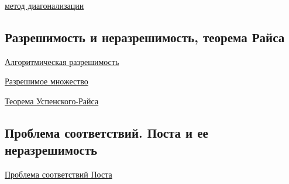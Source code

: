 \documentclass{article}
\begin{document}
\href{https://mipt.lectoriy.ru/file/synopsis/pdf/Maths-CompComplexity-M04-Musatov-140924.04.pdf}{метод диагонализации}

\subsection{Разрешимость и неразрешимость, теорема Райса}

\href{https://ru.wikipedia.org/wiki/%D0%90%D0%BB%D0%B3%D0%BE%D1%80%D0%B8%D1%82%D0%BC%D0%B8%D1%87%D0%B5%D1%81%D0%BA%D0%B0%D1%8F_%D1%80%D0%B0%D0%B7%D1%80%D0%B5%D1%88%D0%B8%D0%BC%D0%BE%D1%81%D1%82%D1%8C}{Алгоритмическая разрешимость}

\href{https://ru.wikipedia.org/wiki/%D0%A0%D0%B0%D0%B7%D1%80%D0%B5%D1%88%D0%B8%D0%BC%D0%BE%D0%B5_%D0%BC%D0%BD%D0%BE%D0%B6%D0%B5%D1%81%D1%82%D0%B2%D0%BE}{Разрешимое множество}

\href{https://neerc.ifmo.ru/wiki/index.php?title=%D0%A1%D0%B2%D0%BE%D0%B9%D1%81%D1%82%D0%B2%D0%B0_%D0%BF%D0%B5%D1%80%D0%B5%D1%87%D0%B8%D1%81%D0%BB%D0%B8%D0%BC%D1%8B%D1%85_%D1%8F%D0%B7%D1%8B%D0%BA%D0%BE%D0%B2._%D0%A2%D0%B5%D0%BE%D1%80%D0%B5%D0%BC%D0%B0_%D0%A3%D1%81%D0%BF%D0%B5%D0%BD%D1%81%D0%BA%D0%BE%D0%B3%D0%BE-%D0%A0%D0%B0%D0%B9%D1%81%D0%B0}{Теорема Успенского-Райса}

\subsection{Проблема соответствий. Поста и ее неразрешимость}

\href{https://neerc.ifmo.ru/wiki/index.php?title=%D0%9F%D1%80%D0%B8%D0%BC%D0%B5%D1%80%D1%8B_%D0%BD%D0%B5%D1%80%D0%B0%D0%B7%D1%80%D0%B5%D1%88%D0%B8%D0%BC%D1%8B%D1%85_%D0%B7%D0%B0%D0%B4%D0%B0%D1%87:_%D0%BF%D1%80%D0%BE%D0%B1%D0%BB%D0%B5%D0%BC%D0%B0_%D1%81%D0%BE%D0%BE%D1%82%D0%B2%D0%B5%D1%82%D1%81%D1%82%D0%B2%D0%B8%D0%B9_%D0%9F%D0%BE%D1%81%D1%82%D0%B0}{Проблема соответствий Поста}
\end{document}
